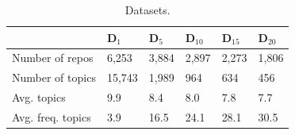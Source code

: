 %


\begin{table}[h!]
	\begin{tabular}{|l|l|l|l|l|l|} \hline
		 & \textbf{ D$_{1}$} & \textbf{D$_{5}$} & \textbf{ D$_{10}$} & \textbf{D$_{15}$} & \textbf{D$_{20}$} \\ \hline
		Number of repos & 6,253 & 3,884 & 2,897  & 2,273 & 1,806  \\ \hline
		Number of topics & 15,743 & 1,989 & 964 & 634 & 456 \\ \hline
		Avg. topics & 9.9 & 8.4 & 8.0  & 7.8 & 7.7 \\ \hline
		Avg. freq. topics & 3.9  & 16.5  & 24.1  & 28.1  & 30.5  \\ \hline
	\end{tabular}
	\caption{Datasets.}
	\label{tab:Datasets}	
\end{table}



